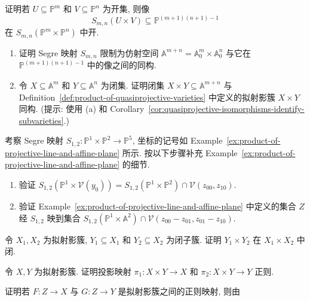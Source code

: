 \BookExerciseHeading
\begin{BookExercises}
  \item\label{ex:segre-image-of-product-of-projective-open-sets-is-open} 证明若 $U\subseteq\mathbb{P}^{m}$ 和 $V\subseteq\mathbb{P}^{n}$ 为开集, 则像
  \[
    S_{m,n}(U\times V)\subseteq\mathbb{P}^{(m+1)(n+1)-1}
  \]
  在 $S_{m,n}(\mathbb{P}^{m}\times\mathbb{P}^{n})$ 中开.
  \item\label{ex:segre-map-restricts-to-affine-product-isomorphism}
  \begin{enumerate}
    \item 证明 Segre 映射 $S_{m,n}$ 限制为仿射空间 $\mathbb{A}^{m+n}=\mathbb{A}^{m}_{0}\times\mathbb{A}^{n}_{0}$ 与它在 $\mathbb{P}^{(m+1)(n+1)-1}$ 中的像之间的同构.
    \item 令 $X\subseteq\mathbb{A}^{m}$ 和 $Y\subseteq\mathbb{A}^{n}$ 为闭集. 证明闭集 $X\times Y\subseteq\mathbb{A}^{m+n}$ 与 Definition~\ref{def:product-of-quasiprojective-varieties} 中定义的拟射影簇 $X\times Y$ 同构. (提示: 使用 (a) 和 Corollary~\ref{cor:quasiprojective-isomorphisms-identify-subvarieties}.)
  \end{enumerate}
  \item\label{ex:verify-closed-subset-of-projective-line-times-affine-plane} 考察 Segre 映射 $S_{1,2}:\mathbb{P}^{1}\times\mathbb{P}^{2}\to\mathbb{P}^{5}$, 坐标的记号如 Example~\ref{ex:product-of-projective-line-and-affine-plane} 所示. 按以下步骤补充 Example~\ref{ex:product-of-projective-line-and-affine-plane} 的细节.
  \begin{enumerate}
    \item 验证 $S_{1,2}(\mathbb{P}^{1}\times\mathcal{V}(y_{0}))=S_{1,2}(\mathbb{P}^{1}\times\mathbb{P}^{2})\cap\mathcal{V}(z_{00},z_{10})$.
    \item 验证 Example~\ref{ex:product-of-projective-line-and-affine-plane} 中定义的集合 $Z$ 经 $S_{1,2}$ 映到集合 $S_{1,2}(\mathbb{P}^{1}\times\mathbb{A}^{2})\cap\mathcal{V}(z_{00}-z_{01},z_{01}-z_{10})$.
  \end{enumerate}
  \item\label{ex:product-of-closed-quasiprojective-subvarieties-is-closed} 令 $X_{1},X_{2}$ 为拟射影簇, $Y_{1}\subseteq X_{1}$ 和 $Y_{2}\subseteq X_{2}$ 为闭子簇. 证明 $Y_{1}\times Y_{2}$ 在 $X_{1}\times X_{2}$ 中闭.
  \item\label{ex:quasiprojective-product-projections-are-regular} 令 $X,Y$ 为拟射影簇. 证明投影映射 $\pi_{1}:X\times Y\to X$ 和 $\pi_{2}:X\times Y\to Y$ 正则.
  \item\label{ex:quasiprojective-products-of-regular-maps} 证明若 $F:Z\to X$ 与 $G:Z\to Y$ 是拟射影簇之间的正则映射, 则由

\end{BookExercises}
